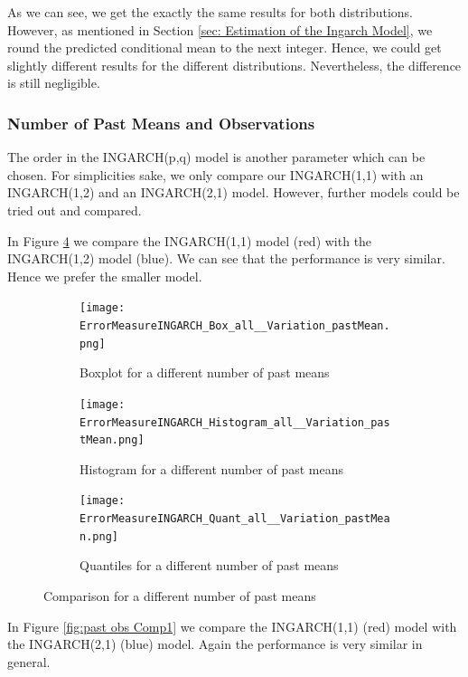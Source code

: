 As we can see, we get the exactly the same results for both distributions. However, as mentioned in Section \ref{sec: Estimation of the Ingarch Model}, we round the predicted conditional mean to the next integer. Hence, we could get slightly different results for the different distributions. Nevertheless, the difference is still negligible. %


\subsubsection{Number of Past Means and Observations}
\label{sec: Number of Past Means and Observations}

The order in the INGARCH(p,q) model is another parameter which can be chosen. For simplicities sake, we only compare our INGARCH(1,1) with an INGARCH(1,2) and an INGARCH(2,1) model. However, further models could be tried out and compared. 

In Figure \ref{fig:past means Comp1} we compare the INGARCH(1,1) model (red) with the INGARCH(1,2) model (blue). We can see that the performance is very similar. Hence we prefer the smaller model. 
\begin{figure}[htb!]
\centering
\begin{subfigure}[b]{0.45\textwidth}
\texttt{[image: ErrorMeasureINGARCH\_Box\_all\_\_Variation\_pastMean.png]}
\caption{Boxplot for a different number of past means}
\label{fig:past means Box}
\end{subfigure}
\hfill
\begin{subfigure}[b]{0.45\textwidth}
\texttt{[image: ErrorMeasureINGARCH\_Histogram\_all\_\_Variation\_pastMean.png]}
\caption{Histogram for a different number of past means}
\label{fig:past means Hist}
\end{subfigure}
\hfill
\begin{subfigure}[b]{0.8\textwidth}
\texttt{[image: ErrorMeasureINGARCH\_Quant\_all\_\_Variation\_pastMean.png]}
\caption{Quantiles for a different number of past means}
\label{fig:past means Quant}
\end{subfigure}
\caption{Comparison for a different number of past means}
\label{fig:past means Comp1}
\end{figure}


In Figure \ref{fig:past obs Comp1} we compare the INGARCH(1,1) (red) model with the INGARCH(2,1) (blue) model. Again the performance is very similar in general. 


